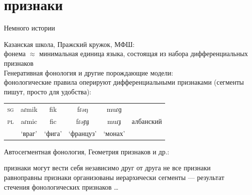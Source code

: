 \section{признаки}
\begin{frame}{Немного истории}
\begin{itemize}
\mytem Казанская школа, Пражский кружок, МФШ:\\
фонема $\approx$ минимальная единица языка, состоящая из набора дифференциальных признаков\\ 
\mytem Генеративная фонология и другие порождающие модели:\\
фонологические правила оперируют дифференциальными признаками (сегменты пишут, просто для удобства):
\end{itemize}
\begin{tabular}{lccccr}
\textsc{sg} & aɾmi\alert{k} & fi\alert{k} & fɾə\alert{ŋ} & muɾ\alert{ɡ} & \citep{buchholz87} \\
\textsc{pl} & aɾmi\alert{c} & fi\alert{c} & fɾə\alert{ɲɟ} & muɾ\alert{ɟ} & албанский  \\
      & ‘враг’ & ‘фига’ & ‘француз’ & ‘монах’ &\\
\end{tabular}
\begin{itemize}
\mytem Автосегментная фонология, Геометрия признаков и др.:
\begin{itemize}
\mytem признаки могут вести себя независимо друг от друга
\mytem не все признаки равноправны 
\mytem признаки организованы иерархически 
\mytem сегменты — результат стечения фонологических признаков \ldots
\end{itemize}
\end{itemize}
\end{frame}

